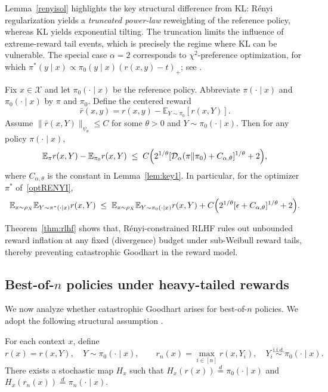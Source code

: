 \documentclass[11pt]{article}
\providecommand{\DD}{\mathcal{D}}
\begin{document}
Lemma~\ref{renyisol} highlights the key structural difference from KL: R\'enyi
regularization yields a \emph{truncated power-law} reweighting of the reference
policy, whereas KL yields exponential tilting.  The truncation limits the
influence of extreme-reward tail events, which is precisely the regime where KL
can be vulnerable.
The special case $\alpha=2$ corresponds to $\chi^2$-preference optimization, for
which $\pi^*(y\mid x)\propto\pi_0(y\mid x)(r(x,y)-t)_+$; see
\cite{huang2025correcting}.

\begin{theorem}\label{thm:rlhf}
Fix $x\in\mathcal X$ and let $\pi_0(\cdot\mid x)$ be the reference policy.
Abbreviate $\pi(\cdot\mid x)$ and $\pi_0(\cdot\mid x)$ by $\pi$ and $\pi_0$.
Define the centered reward
\[
\bar r(x,y)=r(x,y)-\mathbb{E}_{Y\sim\pi_0}[r(x,Y)].
\]
Assume $\|\bar r(x,Y)\|_{\psi_\theta}\le C$ for some $\theta>0$ and
$Y\sim\pi_0(\cdot\mid x)$.
Then for any policy $\pi(\cdot\mid x)$,
\[
\mathbb{E}_{\pi} r(x,Y) - \mathbb{E}_{\pi_0} r(x,Y)
\;\le\;
C\Bigl(2^{1/\theta}[\DD_\alpha(\pi\|\pi_0)+C_{\alpha,\theta}]^{1/\theta}
+2\Bigr),
\]
where $C_{\alpha,\theta}$ is the constant in Lemma~\ref{lem:key1}.
In particular, for the optimizer $\pi^*$ of~\eqref{optRENYI},
\[
\mathbb{E}_{x\sim\rho_X}\mathbb{E}_{Y\sim\pi^*(\cdot\mid x)} r(x,Y)
\;\le\;
\mathbb{E}_{x\sim\rho_X}\mathbb{E}_{Y\sim\pi_0(\cdot\mid x)} r(x,Y)
+ C\Bigl(2^{1/\theta} [\epsilon+C_{\alpha,\theta}]^{1/\theta}+2\Bigr).
\]
\end{theorem}

Theorem~\ref{thm:rlhf} shows that, 
R\'enyi-constrained RLHF rules out unbounded reward inflation at any fixed (divergence) budget under sub-Weibull reward tails, thereby preventing catastrophic Goodhart in the reward model.

\subsection{Best-of-\texorpdfstring{$n$}{n} policies under heavy-tailed rewards}

We now analyze whether catastrophic Goodhart arises for best-of-$n$ policies.
We adopt the following structural assumption
\citep{beirami2024theoretical,mroueh2025information}.

\begin{assumption}\label{ass:reward-structure}
For each context $x$, define
\[
r(x)=r(x,Y),\quad Y\sim\pi_0(\cdot\mid x),
\qquad
r_n(x)=\max_{i\in [n]} r(x,Y_i),
\quad Y_i\overset{\mathrm{i.i.d.}}{\sim}\pi_0(\cdot\mid x).
\]
There exists a stochastic map $H_x$ such that
$H_x(r(x))\overset{d}{=}\pi_0(\cdot\mid x)$ and
$H_x(r_n(x))\overset{d}{=}\pi_n(\cdot\mid x)$.
\end{assumption}
\end{document}
